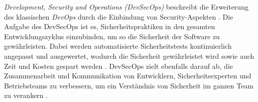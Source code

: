 \textit{Development, Security and Operations (DevSecOps)} beschreibt die Erweiterung des klassischen \textit{DevOps} durch die Einbindung von Security-Aspekten \cite{rajapakse_challenges_2022}. Die Aufgabe des DevSecOps ist es, Sicherheitspraktiken in den gesamten Entwicklungszyklus einzubinden, um so die Sicherheit der Software zu gewährleisten. Dabei werden automatisierte Sicherheitstests kontinuierlich angepasst und ausgewertet, wodurch die Sicherheit gewährleistet wird sowie auch Zeit und Kosten gespart werden \cite{lombardi_devops_2023}. DevSecOps zielt ebenfalls darauf ab, die Zusammenarbeit und Kommunikation von Entwicklern, Sicherheitsexperten und Betriebsteams zu verbessern, um ein Verständnis von Sicherheit im ganzen Team zu verankern \cite{rajapakse_challenges_2022}.


